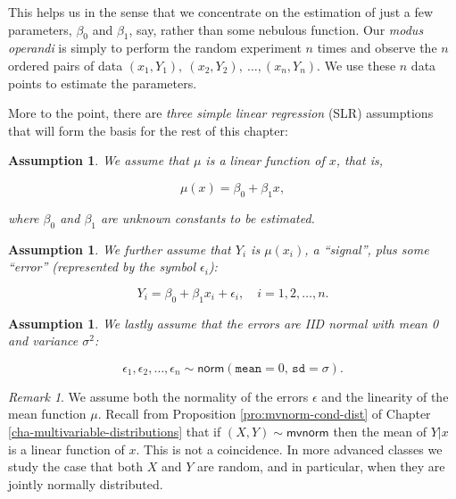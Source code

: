 \documentclass[]{book}
\numberwithin{equation}{chapter}
\numberwithin{figure}{chapter}
\theoremstyle{plain}
\newtheorem{assumption}[thm]{Assumption}
\theoremstyle{definition}
\theoremstyle{remark}
\newtheorem{rem}[thm]{Remark}
\theoremstyle{definition}
\theoremstyle{definition}
\theoremstyle{remark}
\begin{document}
This helps us in the sense that we concentrate on the estimation of just
a few parameters, \(\beta_{0}\) and \(\beta_{1}\), say, rather than some
nebulous function. Our \emph{modus operandi} is simply to perform the
random experiment \(n\) times and observe the \(n\) ordered pairs of
data \((x_{1},Y_{1}),\ (x_{2},Y_{2}),\ \ldots,(x_{n},Y_{n})\). We use
these \(n\) data points to estimate the parameters.

More to the point, there are \emph{three simple linear regression} (SLR)
assumptions  that will form the basis for
the rest of this chapter:

\bigskip

\begin{assumption}
We assume that \(\mu\) is a linear function of \(x\), that is,

\begin{equation}
\mu(x)=\beta_{0}+\beta_{1}x,
\end{equation}

where \(\beta_{0}\) and \(\beta_{1}\) are unknown constants to be
estimated. \bigskip
\end{assumption}\begin{assumption}
We further assume that \(Y_{i}\) is \(\mu(x_{i})\), a ``signal'', plus
some ``error'' (represented by the symbol \(\epsilon_{i}\)):

\begin{equation}
Y_{i} = \beta_{0} + \beta_{1}x_{i} + \epsilon_{i}, \quad i = 1,2,\ldots,n.
\end{equation}
\end{assumption}

\bigskip

\begin{assumption}
We lastly assume that the errors are IID normal with mean 0 and variance
\(\sigma^{2}\):

\begin{equation}
\epsilon_{1},\epsilon_{2},\ldots,\epsilon_{n}\sim\mathsf{norm}(\mathtt{mean}=0,\,\mathtt{sd}=\sigma).
\end{equation}
\end{assumption}

\bigskip

\begin{rem}
We assume both the normality of the errors \(\epsilon\) and the
linearity of the mean function \(\mu\). Recall from Proposition
\ref{pro:mvnorm-cond-dist} of Chapter
\ref{cha-multivariable-distributions} that if
\((X,Y) \sim \mathsf{mvnorm}\) then the mean of \(Y|x\) is a linear
function of \(x\). This is not a coincidence. In more advanced classes
we study the case that both \(X\) and \(Y\) are random, and in
particular, when they are jointly normally distributed.
\end{rem}
\end{document}
